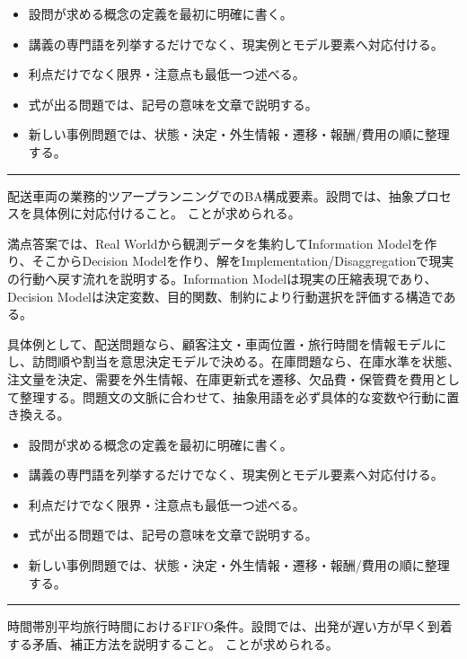 \begin{itemize}
\item 設問が求める概念の定義を最初に明確に書く。
\item 講義の専門語を列挙するだけでなく、現実例とモデル要素へ対応付ける。
\item 利点だけでなく限界・注意点も最低一つ述べる。
\item 式が出る問題では、記号の意味を文章で説明する。
\item 新しい事例問題では、状態・決定・外生情報・遷移・報酬/費用の順に整理する。
\end{itemize}
\vspace{2mm}\hrule\vspace{2mm}
配送車両の業務的ツアープランニングでのBA構成要素。設問では、抽象プロセスを具体例に対応付けること。 ことが求められる。\par
{}
満点答案では、Real Worldから観測データを集約してInformation Modelを作り、そこからDecision Modelを作り、解をImplementation/Disaggregationで現実の行動へ戻す流れを説明する。Information Modelは現実の圧縮表現であり、Decision Modelは決定変数、目的関数、制約により行動選択を評価する構造である。\par
{}
具体例として、配送問題なら、顧客注文・車両位置・旅行時間を情報モデルにし、訪問順や割当を意思決定モデルで決める。在庫問題なら、在庫水準を状態、注文量を決定、需要を外生情報、在庫更新式を遷移、欠品費・保管費を費用として整理する。問題文の文脈に合わせて、抽象用語を必ず具体的な変数や行動に置き換える。\par
{}
\begin{itemize}
\item 設問が求める概念の定義を最初に明確に書く。
\item 講義の専門語を列挙するだけでなく、現実例とモデル要素へ対応付ける。
\item 利点だけでなく限界・注意点も最低一つ述べる。
\item 式が出る問題では、記号の意味を文章で説明する。
\item 新しい事例問題では、状態・決定・外生情報・遷移・報酬/費用の順に整理する。
\end{itemize}
\vspace{2mm}\hrule\vspace{2mm}
時間帯別平均旅行時間におけるFIFO条件。設問では、出発が遅い方が早く到着する矛盾、補正方法を説明すること。 ことが求められる。\par
